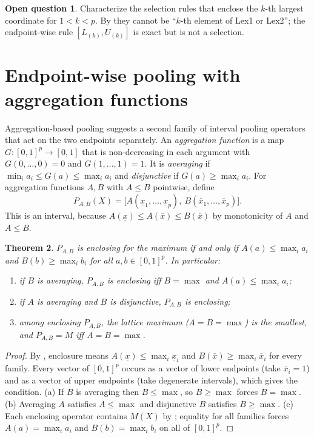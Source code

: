 \documentclass[preprint,12pt]{elsarticle}
\newtheorem{theorem}{Theorem}[section]
\theoremstyle{definition}
\newtheorem{question}[theorem]{Open question}
\newcommand{\lo}[1]{\underline{#1}}
\newcommand{\up}[1]{\overline{#1}}
\begin{document}
\begin{question}
Characterize the selection rules that enclose the $k$-th largest coordinate for $1<k<p$. By  they cannot be ``$k$-th element of Lex1 or Lex2''; the endpoint-wise rule $[L_{(k)},U_{(k)}]$ is exact but is not a selection.
\end{question}

\section{Endpoint-wise pooling with aggregation functions}
\label{sec:agg}

Aggregation-based pooling \cite{rodriguez2022,rodriguez2023,forcen2020} suggests a second family of interval pooling operators that act on the two endpoints separately. An \emph{aggregation function} is a map $G:[0,1]^p\to[0,1]$ that is non-decreasing in each argument with $G(0,\dots,0)=0$ and $G(1,\dots,1)=1$. It is \emph{averaging} if $\min_ia_i\le G(a)\le\max_ia_i$ and \emph{disjunctive} if $G(a)\ge\max_ia_i$. For aggregation functions $A,B$ with $A\le B$ pointwise, define
\[
P_{A,B}(X)=\big[A(\lo x_1,\dots,\lo x_p),\ B(\up x_1,\dots,\up x_p)\big].
\]
This is an interval, because $A(\lo x)\le A(\up x)\le B(\up x)$ by monotonicity of $A$ and $A\le B$.

\begin{theorem}\label{thm:agg}
$P_{A,B}$ is enclosing for the maximum if and only if $A(a)\le\max_ia_i$ and $B(b)\ge\max_ib_i$ for all $a,b\in[0,1]^p$. In particular:
\begin{enumerate}[label=(\alph*)]
\item if $B$ is averaging, $P_{A,B}$ is enclosing iff $B=\max$ and $A(a)\le\max_ia_i$;
\item if $A$ is averaging and $B$ is disjunctive, $P_{A,B}$ is enclosing;
\item among enclosing $P_{A,B}$, the lattice maximum ($A=B=\max$) is the smallest, and $P_{A,B}=M$ iff $A=B=\max$.
\end{enumerate}
\end{theorem}

\begin{proof}
By , enclosure means $A(\lo x)\le\max_i\lo x_i$ and $B(\up x)\ge\max_i\up x_i$ for every family. Every vector of $[0,1]^p$ occurs as a vector of lower endpoints (take $\up x_i=1$) and as a vector of upper endpoints (take degenerate intervals), which gives the condition. (a) If $B$ is averaging then $B\le\max$, so $B\ge\max$ forces $B=\max$. (b) Averaging $A$ satisfies $A\le\max$ and disjunctive $B$ satisfies $B\ge\max$. (c) Each enclosing operator contains $M(X)$ by ; equality for all families forces $A(a)=\max_ia_i$ and $B(b)=\max_ib_i$ on all of $[0,1]^p$.
\end{proof}
\end{document}
